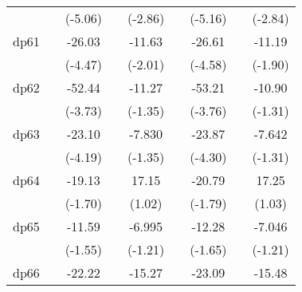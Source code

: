 {\begin{tabular}{l*{8}{c}}
            &                     &     (-5.06)         &                     &     (-2.86)         &                     &     (-5.16)         &                     &     (-2.84)         \\
[1em]
dp61        &                     &      -26.03\sym{***}&                     &      -11.63\sym{*}  &                     &      -26.61\sym{***}&                     &      -11.19         \\
            &                     &     (-4.47)         &                     &     (-2.01)         &                     &     (-4.58)         &                     &     (-1.90)         \\
[1em]
dp62        &                     &      -52.44\sym{***}&                     &      -11.27         &                     &      -53.21\sym{***}&                     &      -10.90         \\
            &                     &     (-3.73)         &                     &     (-1.35)         &                     &     (-3.76)         &                     &     (-1.31)         \\
[1em]
dp63        &                     &      -23.10\sym{***}&                     &      -7.830         &                     &      -23.87\sym{***}&                     &      -7.642         \\
            &                     &     (-4.19)         &                     &     (-1.35)         &                     &     (-4.30)         &                     &     (-1.31)         \\
[1em]
dp64        &                     &      -19.13         &                     &       17.15         &                     &      -20.79         &                     &       17.25         \\
            &                     &     (-1.70)         &                     &      (1.02)         &                     &     (-1.79)         &                     &      (1.03)         \\
[1em]
dp65        &                     &      -11.59         &                     &      -6.995         &                     &      -12.28         &                     &      -7.046         \\
            &                     &     (-1.55)         &                     &     (-1.21)         &                     &     (-1.65)         &                     &     (-1.21)         \\
[1em]
dp66        &                     &      -22.22\sym{***}&                     &      -15.27         &                     &      -23.09\sym{***}&                     &      -15.48         \\

\end{tabular}}
